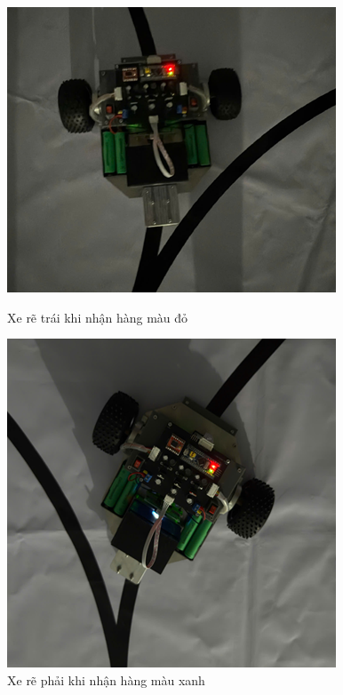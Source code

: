 \begin{figure}[H]
                    \begin{minipage}{0.5\textwidth}
                         \centering
                         \includegraphics[width=\linewidth]{pictures/chapter8/turn_left.png}
                         \caption{Xe rẽ trái khi nhận hàng màu đỏ}
                         \label{fig:chapter8:1.2 - 2}
                    \end{minipage}\hfill
                    \begin{minipage}{0.42\textwidth}
                         \centering
                         \includegraphics[width=\linewidth]{pictures/chapter8/turn_right.png}
                         \caption{Xe rẽ phải khi nhận hàng màu xanh}
                         \label{fig:chapter8:1.2 - 3}
                    \end{minipage}
               \end{figure}

